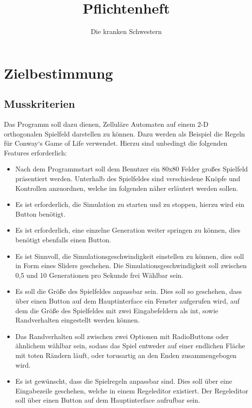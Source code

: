 \documentclass[12pt]{article}
\begin{document}

\title{Pflichtenheft}

\author{Die kranken Schwestern}

\tableofcontents
\pagebreak

\section{Zielbestimmung}
\subsection{Musskriterien}
Das Programm soll dazu dienen, Zelluläre Automaten auf einem 2-D orthogonalen Spielfeld darstellen zu können. Dazu werden als Beispiel die Regeln für Conway`s Game of Life verwendet.
Hierzu sind unbedingt die folgenden Features erforderlich:
\begin{itemize}
    \item Nach dem Programmstart soll dem Benutzer ein 80x80 Felder großes Spielfeld präsentiert werden. Unterhalb des Spielfeldes sind verschiedene Knöpfe und Kontrollen anzuordnen, welche im folgenden näher erläutert werden sollen.
    \item Es ist erforderlich, die Simulation zu starten und zu stoppen, hierzu wird ein Button benötigt. 
    \item Es ist erforderlich, eine einzelne Generation weiter springen zu können, dies benötigt ebenfalls einen Button.
    \item Es ist Sinnvoll, die Simulationsgeschwindigkeit einstellen zu können, dies soll in Form eines Sliders geschehen. Die Simulationsgeschwindigkeit soll zwischen 0,5 und 10 Generationen pro Sekunde frei Wählbar sein.
    \item Es soll die Größe des Spielfeldes anpassbar sein. Dies soll so geschehen, dass über einen Button auf dem Hauptinterface ein Fenster aufgerufen wird, auf dem die Größe des Spielfeldes mit zwei Eingabefeldern als int,  sowie Randverhalten eingestellt werden können.
    \item Das Randverhalten soll zwischen zwei Optionen mit RadioButtons oder ähnlichem wählbar sein, sodass das Spiel entweder auf einer endlichen Fläche mit toten Rändern läuft, oder torusartig an den Enden zusammengebogen wird.
    \item Es ist gewünscht, dass die Spielregeln anpassbar sind. Dies soll über eine Eingabezeile geschehen, welche in einem Regeleditor existiert. Der Regeleditor soll über einen Button auf dem Hauptinterface aufrufbar sein.

\end{itemize}
\end{document}
